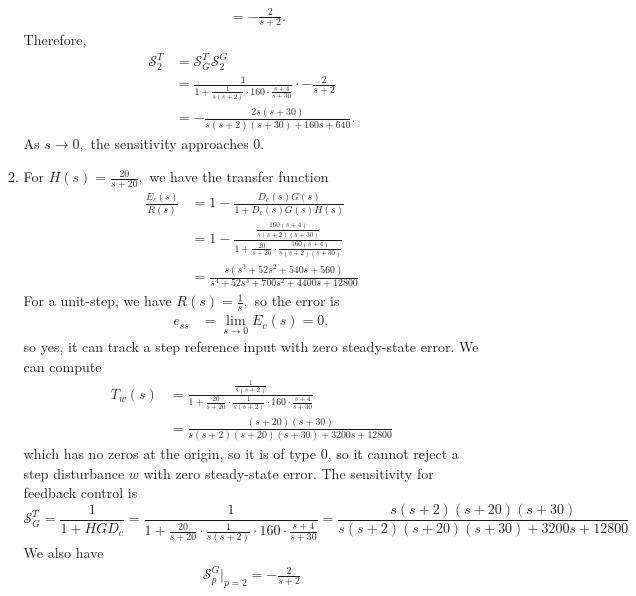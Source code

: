 \documentclass{article}
\numberwithin{equation}{section}
\begin{document}
\begin{enumerate}[label=\textbf{2.\arabic*}]
\begin{enumerate}[label=(\alph*)]
\begin{align}
            &= -\frac{2}{s + 2}.
        \end{align}
        Therefore,
        \begin{align}
            \mathcal{S}^T_2 &= \mathcal{S}^T_G \mathcal{S}^G_2 \\ 
            &= \frac{1}{1+\frac{1}{s(s+2)} \cdot 160 \cdot \frac{s+4}{s+30}} \cdot  -\frac{2}{s + 2} \\ 
            &= - \frac{2s (s + 30)}{s(s + 2) (s + 30) + 160 s + 640}.
        \end{align}
        As $s\to 0,$ the sensitivity approaches $0$.
        \item For $H(s) = \frac{20}{s+20},$ we have the transfer function 
        \begin{align}
            \frac{E_c(s)}{R(s)} &= 1 - \frac{D_c(s)G(s)}{1 + D_c(s)G(s)H(s)} \\ 
            &= 1 - \frac{\frac{160 (s + 4)}{s (s + 2) (s + 30)}}{1 + \frac{20}{s+20} \cdot \frac{160 (s + 4)}{s (s + 2) (s + 30)}} \\ 
            &= \frac{s (s^{3} + 52 s^{2} + 540 s + 560)}{s^{4} + 52 s^{3} + 700 s^{2} + 4400 s + 12800}
        \end{align}
        For a unit-step, we have $R(s) = \frac{1}{s},$ so the error is 
        \begin{align}
            e_{ss} &= \lim_{s\to 0} E_c(s) = 0,
        \end{align}
        so yes, it can track a step reference input with zero steady-state error. We can compute 
        \begin{align}
            T_w(s) &= \frac{\frac{1}{s(s+2)}}{1+\frac{20}{s+20} \cdot \frac{1}{s(s+2)} \cdot 160 \cdot \frac{s+4}{s+30}} \\ 
            &= \frac{(s + 20) (s + 30)}{s (s + 2) (s + 20) (s + 30) + 3200 s + 12800}
        \end{align}
        which has no zeros at the origin, so it is of type 0, so it cannot reject a step disturbance $w$ with zero steady-state error. The sensitivity for feedback control is 
        \begin{equation}
            \mathcal{S}^T_{G} = \frac{1}{1+HGD_c} = \frac{1}{1+\frac{20}{s+20} \cdot \frac{1}{s(s+2)} \cdot 160 \cdot \frac{s+4}{s+30}} = \frac{s (s + 2) (s + 20) (s + 30)}{s (s + 2) (s + 20) (s + 30) + 3200 s + 12800}
        \end{equation}
        We also have 
        \begin{align}
            \mathcal{S}^G_p\bigg|_{p=2} = -\frac{2}{s + 2}

\end{align}
\end{enumerate}
\end{enumerate}
\end{document}
